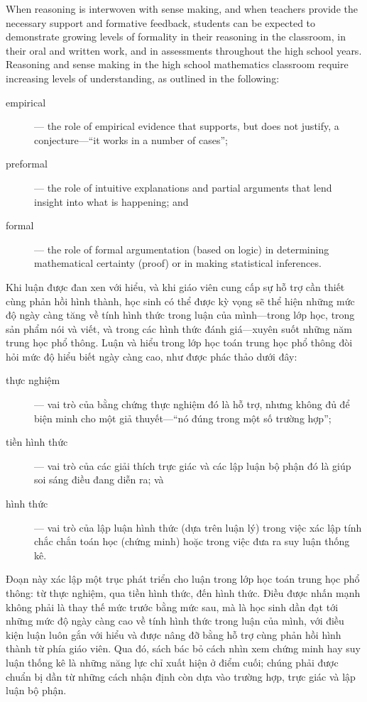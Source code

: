 \documentclass[
  10pt,
  a4paper,
  landscape,
  twoside,
  openany
]{scrbook}
\newcommand{\EN}[1]{#1}
\newcommand{\VI}[1]{#1}
\newcommand{\NOTE}[1]{#1}
\begin{document}
\TriPara
{
\EN{When reasoning is interwoven with sense making, and when teachers provide the necessary support and formative feedback, students can be expected to demonstrate growing levels of formality in their reasoning in the classroom, in their oral and written work, and in assessments throughout the high school years. Reasoning and sense making in the high school mathematics classroom require increasing levels of understanding, as outlined in the following:

\begin{description}
  \item[empirical] --- the role of empirical evidence that supports, but does not justify, a conjecture---``it works in a number of cases'';
  \item[preformal] --- the role of intuitive explanations and partial arguments that lend insight into what is happening; and
  \item[formal] --- the role of formal argumentation (based on logic) in determining mathematical certainty (proof) or in making statistical inferences.
\end{description}
}
}
{
\VI{Khi luận được đan xen với hiểu, và khi giáo viên cung cấp sự hỗ trợ cần thiết cùng phản hồi hình thành, học sinh có thể được kỳ vọng sẽ thể hiện những mức độ ngày càng tăng về tính hình thức trong luận của mình---trong lớp học, trong sản phẩm nói và viết, và trong các hình thức đánh giá---xuyên suốt những năm trung học phổ thông. Luận và hiểu trong lớp học toán trung học phổ thông đòi hỏi mức độ hiểu biết ngày càng cao, như được phác thảo dưới đây:

\begin{description}
  \item[thực nghiệm] --- vai trò của bằng chứng thực nghiệm đó là hỗ trợ, nhưng không đủ để biện minh cho một giả thuyết---``nó đúng trong một số trường hợp'';
  \item[tiền hình thức] --- vai trò của các giải thích trực giác và các lập luận bộ phận đó là giúp soi sáng điều đang diễn ra; và
  \item[hình thức] --- vai trò của lập luận hình thức (dựa trên luận lý) trong việc xác lập tính chắc chắn toán học (chứng minh) hoặc trong việc đưa ra suy luận thống kê.
\end{description}
}
}
{
\NOTE{Đoạn này xác lập một trục phát triển cho luận trong lớp học toán trung học phổ thông: từ thực nghiệm, qua tiền hình thức, đến hình thức. Điều được nhấn mạnh không phải là thay thế mức trước bằng mức sau, mà là học sinh dần đạt tới những mức độ ngày càng cao về tính hình thức trong luận của mình, với điều kiện luận luôn gắn với hiểu và được nâng đỡ bằng hỗ trợ cùng phản hồi hình thành từ phía giáo viên. Qua đó, sách bác bỏ cách nhìn xem chứng minh hay suy luận thống kê là những năng lực chỉ xuất hiện ở điểm cuối; chúng phải được chuẩn bị dần từ những cách nhận định còn dựa vào trường hợp, trực giác và lập luận bộ phận.}
}
\end{document}
